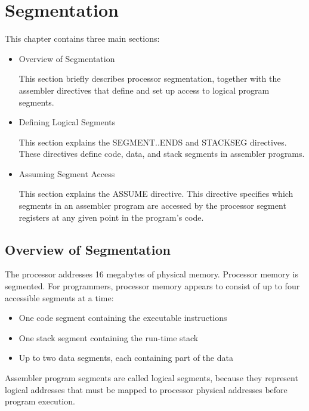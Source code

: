  

\chapter[Segmentation]{Segmentation}

This chapter contains three main sections:

\begin{itemize}
\item Overview of Segmentation

This section briefly describes processor segmentation, together with the assembler directives that define and set up access to logical program segments.
\item Defining Logical Segments 

This section explains the SEGMENT..ENDS and STACKSEG directives. These directives define code, data, and stack segments in assembler programs.
\item Assuming Segment Access

This section explains the ASSUME directive. This directive specifies which segments in an assembler program are accessed by the processor segment registers at any given point in the program's code.
\end{itemize}

\section*{Overview of Segmentation}
The processor addresses 16 megabytes of physical memory. Processor memory is segmented. For programmers, processor memory appears to consist of up to four accessible segments at a time:
\begin{itemize}
\item One code segment containing the executable instructions
\item One stack segment containing the run-time stack
\item Up to two data segments, each containing part of the data
\end{itemize}
Assembler program segments are called logical segments, because they represent logical addresses that must be mapped to processor physical addresses before program execution.

